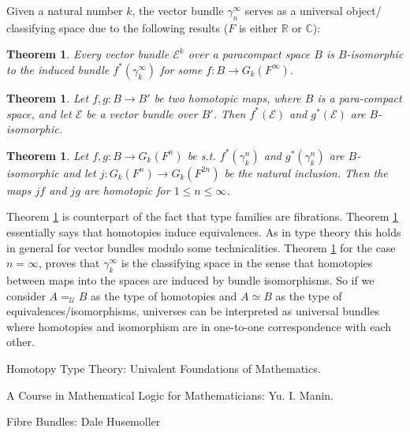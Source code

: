 \documentclass[10pt]{article}
\theoremstyle{definition}
\theoremstyle{plain}
\newtheorem{theorem}[definition]{Theorem}
\theoremstyle{remark}
\newcommand{\U}{\mathscr{U}}
\begin{document}
Given a natural number $k$, the vector bundle $\gamma^{\infty }_n$ serves as a universal object/
classifying space due to the following results ($F$ is either $\mathbb{R}$ or $\mathbb{C}$):

\begin{theorem}\label{T:Ind}
Every vector bundle $\mathscr{E}^k$ over a paracompact space $B$ is $B$-isomorphic
to the induced bundle $f^*(\gamma^{\infty}_k)$ for some ${f : B \to G_k (F^{ \infty })}$.
\end{theorem}

\begin{theorem}\label{T:Hom to Eq}
Let $f, g: B \to B'$ be two homotopic maps, where $B$ is a para-compact space, 
and let $\mathscr{E}$ be a vector bundle over $B'$. Then $f^*(\mathscr{E})$ and 
$g^*(\mathscr{E})$ are $B$-isomorphic.
\end{theorem}

\begin{theorem}\label{T:Eq to Hom}
Let $f, g: B \to G_k(F^n)$ be s.t. $f^*(\gamma_k^n)$ and $g^*(\gamma_k^n)$
are $B$-isomorphic and let ${ j: G_k(F^n) \to G_k(F^{2n}) }$ be the natural inclusion. Then the
maps $jf$ and $jg$ are homotopic for $1 \leq n \leq \infty$. 
\end{theorem}

Theorem \ref{T:Ind} is counterpart of the fact that type families are fibrations. Theorem
\ref{T:Hom to Eq} essentially says that homotopies induce equivalences. As in type theory
this holds in general for vector bundles modulo some technicalities. Theorem \ref{T:Eq to Hom}
for the case $n = \infty$, proves that $\gamma^{\infty}_k$ is the classifying space in the 
sense that homotopies between maps into the spaces are induced by bundle isomorphisms.
So if we consider $A =_{\U} B$ as the type of homotopies and $A \simeq B$ as the type of
equivalences/isomorphisms, universes can be interpreted as universal bundles where homotopies
and isomorphism are in one-to-one correspondence with each other.
 


\begin{thebibliography}{99}

Homotopy Type Theory: Univalent Foundations of Mathematics.

A Course in Mathematical Logic for Mathematicians: Yu. I. Manin. 

Fibre Bundles: Dale Husemoller

\end{thebibliography}
\end{document}

